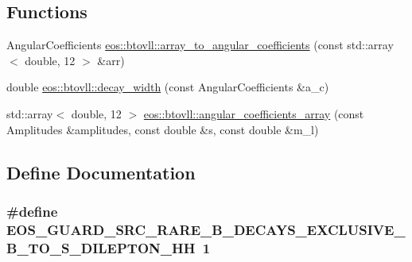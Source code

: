 \subsection*{Functions}
\begin{DoxyCompactItemize}
\item 
AngularCoefficients \hyperlink{namespaceeos_1_1btovll_af4a61503514b02cdc2239f33915ac237}{eos::btovll::array\_\-to\_\-angular\_\-coefficients} (const std::array$<$ double, 12 $>$ \&arr)
\item 
double \hyperlink{namespaceeos_1_1btovll_a7cdeae9d6d5f6d7b7df686f4ec9358c0}{eos::btovll::decay\_\-width} (const AngularCoefficients \&a\_\-c)
\item 
std::array$<$ double, 12 $>$ \hyperlink{namespaceeos_1_1btovll_ab3d297e4fc263252e595a1447427afd9}{eos::btovll::angular\_\-coefficients\_\-array} (const Amplitudes \&amplitudes, const double \&s, const double \&m\_\-l)
\end{DoxyCompactItemize}


\subsection{Define Documentation}
\hypertarget{exclusive-b-to-s-dilepton_8hh_abc2ad3337a546fab596884c2f5e8ffa6}{
\subsubsection[{EOS\_\-GUARD\_\-SRC\_\-RARE\_\-B\_\-DECAYS\_\-EXCLUSIVE\_\-B\_\-TO\_\-S\_\-DILEPTON\_\-HH}]{\setlength{\rightskip}{0pt plus 5cm}\#define EOS\_\-GUARD\_\-SRC\_\-RARE\_\-B\_\-DECAYS\_\-EXCLUSIVE\_\-B\_\-TO\_\-S\_\-DILEPTON\_\-HH~1}}
\label{exclusive-b-to-s-dilepton_8hh_abc2ad3337a546fab596884c2f5e8ffa6}
